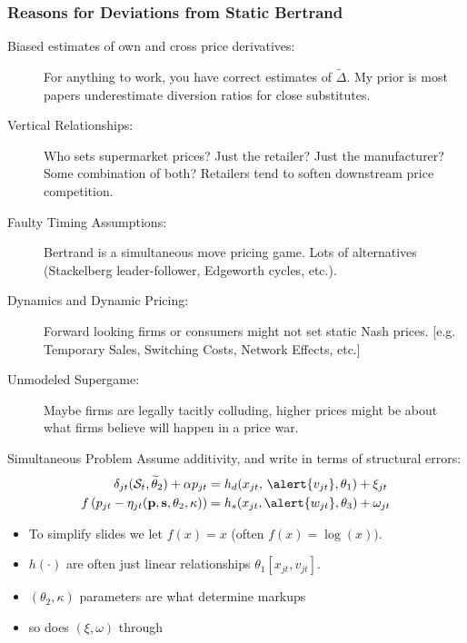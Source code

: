 \documentclass[xcolor=pdftex,dvipsnames,table,mathserif,aspectratio=169]{beamer}
\begin{document}
\begin{frame}
\frametitle{Reasons for Deviations from Static Bertrand}
\small
\begin{description}
\item[Biased estimates of own and cross price derivatives:] For anything to work, you have correct estimates of $\tilde{\Delta}$. My prior is most papers \alert{underestimate} diversion ratios for close substitutes.
\item[Vertical Relationships:] Who sets supermarket prices? Just the retailer? Just the manufacturer? Some combination of both? Retailers tend to \alert{soften} downstream price competition.
\item[Faulty Timing Assumptions:] Bertrand is a simultaneous move pricing game. Lots of alternatives (Stackelberg leader-follower, Edgeworth cycles, etc.).
\item[Dynamics and Dynamic Pricing:] Forward looking firms or consumers might not set static Nash prices. [e.g. Temporary Sales, Switching Costs, Network Effects, etc.]
\item[Unmodeled Supergame:] Maybe firms are legally tacitly colluding, higher prices might be about what firms believe will happen in a price war.
\end{description}
\end{frame}


\begin{frame}{Simultaneous Problem}
Assume additivity, and write in terms of structural errors:
\begin{align*}
\delta_{jt}(\mathcal{S}_t,\widetilde{\theta}_2) + \alpha p_{jt} &= h_d(x_{jt}, \, \alert{v_{jt}},\theta_1)  + \xi_{jt} \\
 f \left( p_{jt} - \eta_{jt}(\mathbf{p},\mathbf{s},\theta_2,\kappa) \right) &= h_s(x_{jt}, \alert{w_{jt}},\theta_3) + \omega_{jt}
\end{align*}
\vspace{-.4cm}
\begin{itemize}
\item To simplify slides we let $f(x)=x$ (often $f(x) =\log(x))$.
\item $h(\cdot)$ are often just linear relationships $\theta_1 [x_{jt}, v_{jt}]$.
\item $(\theta_2, \kappa)$ parameters are what determine markups
\item so does $(\xi,\omega)$ through 
\end{itemize}
\end{frame}
\end{document}
